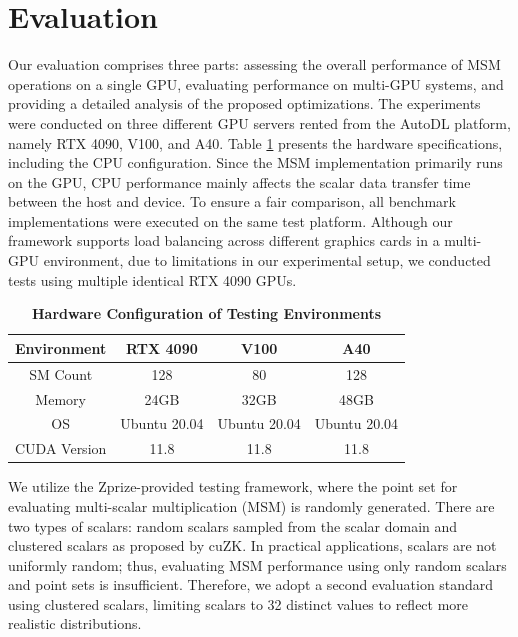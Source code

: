 \documentclass[journal=tches,final]{iacrtrans}
\begin{document}
\section{Evaluation}
\label{sec:Evaluation}

Our evaluation comprises three parts: assessing the overall performance of MSM operations on a single GPU, evaluating performance on multi-GPU systems, and providing a detailed analysis of the proposed optimizations. The experiments were conducted on three different GPU servers rented from the AutoDL platform, namely RTX 4090, V100, and A40. Table \ref{tab:hardware-config} presents the hardware specifications, including the CPU configuration. Since the MSM implementation primarily runs on the GPU, CPU performance mainly affects the scalar data transfer time between the host and device. To ensure a fair comparison, all benchmark implementations were executed on the same test platform. Although our framework supports load balancing across different graphics cards in a multi-GPU environment, due to limitations in our experimental setup, we conducted tests using multiple identical RTX 4090 GPUs.

\begin{table}[htbp]
    \caption{\textbf{Hardware Configuration of Testing Environments}} %
    \centering
    \begin{tabular}{|c|c|c|c|}
    \hline
    \textbf{Environment} & \textbf{RTX 4090} & \textbf{V100} & \textbf{A40} \\
    \hline
    SM Count & 128 & 80 & 128  \\
    \hline
    Memory & 24GB & 32GB & 48GB  \\
    \hline
    OS & Ubuntu 20.04 & Ubuntu 20.04 & Ubuntu 20.04 \\
    \hline
    CUDA Version & 11.8 & 11.8 & 11.8 \\
    \hline
    \end{tabular}
    \label{tab:hardware-config} %
\end{table}

We utilize the Zprize-provided testing framework, where the point set for evaluating multi-scalar multiplication (MSM) is randomly generated. There are two types of scalars: random scalars sampled from the scalar domain and clustered scalars as proposed by cuZK. In practical applications, scalars are not uniformly random; thus, evaluating MSM performance using only random scalars and point sets is insufficient. Therefore, we adopt a second evaluation standard using clustered scalars, limiting scalars to 32 distinct values to reflect more realistic distributions.
\end{document}
